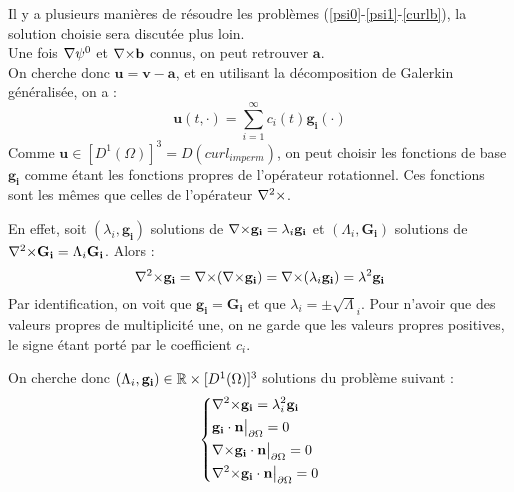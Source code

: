 Il y a plusieurs manières de résoudre les problèmes (\ref{psi0}-\ref{psi1}-\ref{curlb}), la solution choisie sera discutée plus loin.\\

Une fois ${\nabla}\psi^0$ et ${\nabla\times} \mathbf{b}$ connus, on peut retrouver $\mathbf{a}$.\\

On cherche donc $\mathbf{u}=\mathbf{v}-\mathbf{a}$, et en utilisant la décomposition de Galerkin généralisée, on a :
\begin{equation}
\label{u}
\mathbf{u}(t,\cdot) = \sum_{i=1}^{\infty} c_i(t)\mathbf{g_i}(\cdot)
\end{equation}
Comme $\mathbf{u}\in [D^1(\Omega)]^3=D(curl_{imperm})$, on peut choisir les fonctions de base
$\mathbf{g_i}$ comme étant les fonctions propres de l'opérateur rotationnel. Ces
fonctions sont les mêmes que celles de l'opérateur ${\nabla^2\times}$.

En effet, soit $(\lambda_i,\mathbf{g_i})$ solutions de ${\nabla\times} \mathbf{g_i} = \lambda_i\mathbf{g_i}$ et $(\Lambda_i,\mathbf{G_i})$ solutions de ${\nabla^2\times} \mathbf{G_i} = \Lambda_i\mathbf{G_i}$. Alors :
\[
{\nabla^2\times} \mathbf{g_i} = {\nabla\times}({\nabla\times} \mathbf{g_i})={\nabla\times}(\lambda_i\mathbf{g_i})=\lambda^2\mathbf{g_i}
\]
Par identification, on voit que $\mathbf{g_i}=\mathbf{G_i}$ et que $\lambda_i=\pm\sqrt\Lambda_i$. Pour n'avoir que des valeurs propres de multiplicité une, on ne garde que les valeurs propres positives, le signe étant porté par le coefficient $c_i$.

On cherche donc $(\Lambda_i,\mathbf{g_i})\in{\mathbb{R}}\times [D^1(\Omega)]^3$ solutions du problème suivant :
\begin{equation}
\label{curlcurl}
\left\{
\begin{aligned}
&{\nabla^2\times}  \mathbf{g_i} = \lambda_i^2 \mathbf{g_i}\\
&\mathbf{g_i}\cdot \mathbf{n}{\big\rvert_{\partial\Omega}} = 0\\
&{\nabla\times} \mathbf{g_i}\cdot \mathbf{n}{\big\rvert_{\partial\Omega}} = 0\\
&{\nabla^2\times}  \mathbf{g_i}\cdot \mathbf{n}{\big\rvert_{\partial\Omega}} = 0
\end{aligned}
\right.
\end{equation}

